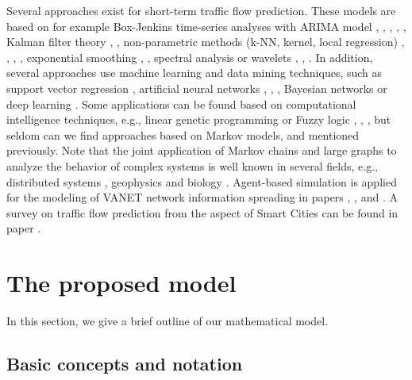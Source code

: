 \documentclass[b5paper,12pt]{report}
\theoremstyle{definition}
\begin{document}
Several approaches exist for short-term traffic flow prediction. These models are based on for example Box-Jenkins time-series analyses with ARIMA model \cite{van1996combining}, \cite{lee1999application}, \cite{stathopoulos2003multivariate}, \cite{ghosh2009multivariate}, \cite{xue2008short}, Kalman filter theory \cite{wang2005real}, \cite{ngoduy2011low}, non-parametric methods (k-NN, kernel, local regression) \cite{davis1991nonparametric}, \cite{smith2002comparison}, \cite{turochy2004relating}, \cite{smith1997traffic}, exponential smoothing \cite{messer1993advanced}, \cite{castro2009online}, spectral analysis \cite{nicholson1974prediction} or wavelets \cite{jiang2005dynamic}, \cite{xie2006wavelet}, \cite{cheng2007mining}. In addition, several approaches use machine learning and data mining techniques, such as support vector regression \cite{jeong2013supervised}, artificial neural networks \cite{chan2012neural}, \cite{park1998short}, \cite{dia2001object}, Bayesian networks \cite{sun2006bayesian} or deep learning \cite{lv2015traffic}. Some applications can be found based on computational intelligence techniques, e.g., linear genetic programming \cite{brameier2007basic} or Fuzzy logic \cite{iokibe1993traffic}, \cite{li2006type}, \cite{zhang2008short}, but seldom can we find approaches based on Markov models, \cite{necula2014dynamic} and \cite{Crisostomietal2011} mentioned previously. Note that the joint application of Markov chains and large graphs to analyze the behavior of complex systems is well known in several fields, e.g., distributed systems \cite{dabrowski2011hunt}, geophysics \cite{Cavers2015Vasudevan} and biology \cite{Lesne2006}. Agent-based simulation is applied for the modeling of VANET network information spreading in papers \cite{10.1007/978-3-319-99813-8_15}, \cite{varga2020statistical}, \cite{doi:10.1142/S0219525920500095} and \cite{ilyes2020spatial}. A survey on traffic flow prediction from the aspect of Smart Cities can be found in paper \cite{NAGY2018148}.

\section{The proposed model}
\label{model-desc}

In this section, we give a brief outline of our mathematical model.

\subsection{Basic concepts and notation}
\label{model-basics}
\end{document}

